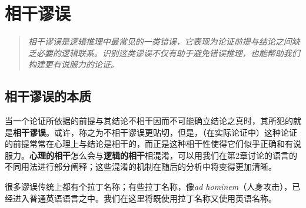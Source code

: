 \section{相干谬误}

\begin{quotation}
\textit{相干谬误是逻辑推理中最常见的一类错误，它表现为论证前提与结论之间缺乏必要的逻辑联系。识别这类谬误不仅有助于避免错误推理，也能帮助我们构建更有说服力的论证。}
\end{quotation}

\subsection{相干谬误的本质}

当一个论证所依据的前提与其结论不相干因而不可能确立结论之真时，其所犯的就是\textbf{相干谬误}。或许，称之为不相干谬误更贴切，但是，（在实际论证中）这种论证的前提常常在心理上与结论是相干的，而正是这种相干性使得它们似乎正确和有说服力。\textbf{心理的相干}怎么会与\textbf{逻辑的相干}相混淆，可以用我们在第2章讨论的语言的不同用法进行部分阐释；这些混淆的机制在随后的分析中将变得更加清晰。

很多谬误传统上都有个拉丁名称；有些拉丁名称，像\textit{ad hominem}（人身攻击），已经进入普通英语语言之中。我们在这里将既使用拉丁名称又使用英语名称。 
